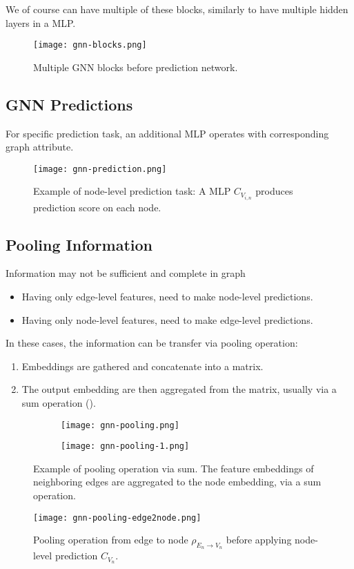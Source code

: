 We of course can have multiple of these blocks, similarly to have multiple hidden layers in a \ac{MLP}.
\begin{figure}[hbt!]
	\centering
	\texttt{[image: gnn-blocks.png]}
	\caption{Multiple \ac{GNN} blocks before prediction network.}
	\label{fig:gnn-blocks}
\end{figure}

\subsection{GNN Predictions}
For specific prediction task, an additional \ac{MLP} operates with corresponding graph attribute.
\begin{figure}[hbt!]
	\centering
	\texttt{[image: gnn-prediction.png]}
	\caption{Example of node-level prediction task: A \ac{MLP} $C_{V_{i,n}}$ produces prediction score on each node.}
	\label{fig:gnn-prediction}
\end{figure}

\subsection{Pooling Information}
Information may not be sufficient and complete in graph
\begin{itemize}
	\item Having only edge-level features, need to make node-level predictions.
	\item Having only node-level features, need to make edge-level predictions.
\end{itemize}

In these cases, the information can be transfer via pooling operation:
\begin{enumerate}
	\item Embeddings are gathered and concatenate into a matrix.
	\item The output embedding are then aggregated from the matrix, usually via a sum operation ().
\end{enumerate}
\begin{figure}[hbt!]
	\centering
	\begin{subfigure}[b]{0.47\textwidth}
		\centering
		\texttt{[image: gnn-pooling.png]}
	\end{subfigure}
	\hfill
	\begin{subfigure}[b]{0.47\textwidth}
		\centering
		\texttt{[image: gnn-pooling-1.png]}
	\end{subfigure}
	\caption{Example of pooling operation via sum. The feature embeddings of neighboring edges are aggregated to the node embedding, via a sum operation.}
	\label{fig:gnn-pooling}
\end{figure}
\begin{figure}[hbt!]
	\centering
	\texttt{[image: gnn-pooling-edge2node.png]}
	\caption{Pooling operation from edge to node $\rho_{E_n \rightarrow V_n}$ before applying node-level prediction $C_{V_n}$.}
	\label{fig:gnn-pooling-edge2node}
\end{figure}


